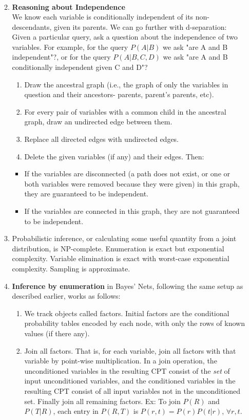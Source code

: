 \documentclass[10pt]{article}
\begin{document}
\begin{multicols}{2}
\begin{enumerate}
\begin{enumerate}
\begin{align*}
        \end{align*}
        \item \textbf{Reasoning about Independence} \\
        We know each variable is conditionally independent of its non-descendants, given its parents. We can go further with d-separation: Given a particular query, ask a question about the independence of two variables. For example, for the query $P(A|B)$ we ask "are A and B independent"?, or for the query $P(A|B,C,D)$ we ask "are A and B conditionally independent given C and D"?
        \begin{enumerate}
            \item Draw the ancestral graph (i.e., the graph of only the variables in question and their ancestors- parents, parent's parents, etc).
            \item For every pair of variables with a common child in the ancestral graph, draw an undirected edge between them.
            \item Replace all directed edges with undirected edges.
            \item Delete the given variables (if any) and their edges. Then: 
        \end{enumerate}
        \begin{itemize}
            \item If the variables are disconnected (a path does not exist, or one or both variables were removed because they were given) in this graph, they are guaranteed to be independent.
            \item If the variables are connected in this graph, they are not guaranteed to be independent.
        \end{itemize} 
        \item Probabilistic inference, or calculating some useful quantity from a joint distribution, is NP-complete. Enumeration is exact but exponential complexity. Variable elimination is exact with worst-case exponential complexity. Sampling is approximate.
        \item \textbf{Inference by enumeration} in Bayes' Nets, following the same setup as described earlier, works as follows: 
        \begin{enumerate}
            \item We track objects called factors. Initial factors are the conditional probability tables encoded by each node, with only the rows of known values (if there any).
            \item Join all factors. That is, for each variable, join all factors with that variable by point-wise multiplication. In a join operation, the unconditioned variables in the resulting CPT consist of the \textit{set} of input unconditioned variables, and the conditioned variables in the resulting CPT consist of all input variables not in the unconditioned set. Finally  join all remaining factors. Ex: To join $P(R)$ and $P(T|R)$, each entry in $P(R,T)$ is $P(r,t)=P(r)P(t|r)$, $\forall r,t$.

\end{enumerate}
\end{enumerate}
\end{enumerate}
\end{multicols}
\end{document}
